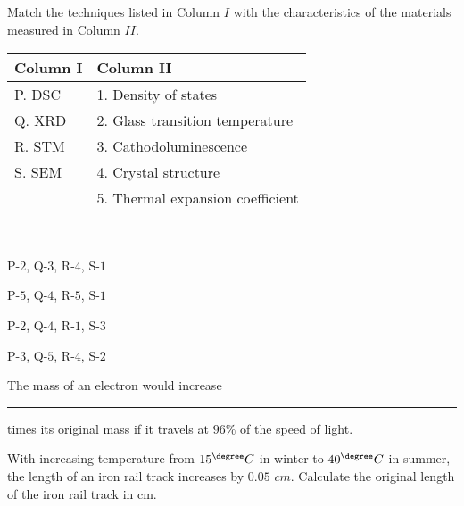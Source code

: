 \iffalse
	\title{2015-XE-53-65}
	\author{EE24Btech11024 - G. Abhimanyu Koushik}
	\section{xe}
	\chapter{2015}
\fi

\item Match the techniques listed in Column $I$ with the characteristics of the materials measured in Column $II$.
\\\begin{table}[h!]    
  \centering
  \begin{tabular}{| p{3cm} | p{6cm} |}
    \hline
    \textbf{Column I} & \textbf{Column II} \\
    \hline
    P. DSC & 1. Density of states \\
    \hline
    Q. XRD & 2. Glass transition temperature \\
    \hline
    R. STM & 3. Cathodoluminescence \\
    \hline
    S. SEM & 4. Crystal structure \\
    \hline
    & 5. Thermal expansion coefficient \\
    \hline
\end{tabular}
\end{table}\\

\hfill{}
\begin{enumerate}
\begin{multicols}{2}
\item P-$2$, Q-$3$, R-$4$, S-$1$
\item P-$5$, Q-$4$, R-$5$, S-$1$
\item P-$2$, Q-$4$, R-$1$, S-$3$
\item P-$3$, Q-$5$, R-$4$, S-$2$
\end{multicols}
\end{enumerate}

\item The mass of an electron would increase \rule{1cm}{0.15mm} times its original mass if it travels at $96\%$ of the speed of light.

\hfill{}

\item With increasing temperature from $15^{{{{\degree}}}} C$ in winter to $40^{{{{\degree}}}} C$ in summer, the length of an iron rail track increases by $0.05$ $cm$. Calculate the original length of the iron rail track in cm. \\

